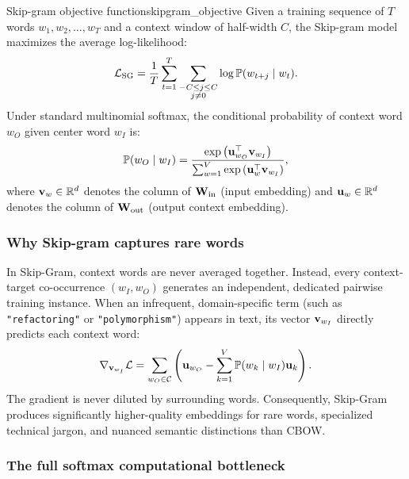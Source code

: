 \documentclass[../../../main.tex]{subfiles}
\begin{document}
\begin{definition}{Skip-gram objective function}{skipgram_objective}
Given a training sequence of $T$ words $w_1, w_2, \dots, w_T$ and a context window of half-width $C$, the Skip-gram model maximizes the average log-likelihood:
\begin{equation}
\label{eq:skipgram_loglik}
\mathcal{L}_{\text{SG}} = \frac{1}{T} \sum_{t=1}^T \sum_{\substack{-C \le j \le C \\ j \neq 0}} \log \mathbb{P}(w_{t+j} \mid w_t).
\end{equation}
Under standard multinomial softmax, the conditional probability of context word $w_O$ given center word $w_I$ is:
\begin{equation}
\label{eq:skipgram_softmax}
\mathbb{P}(w_O \mid w_I) = \frac{\exp\left( \mathbf{u}_{w_O}^\top \mathbf{v}_{w_I} \right)}{\sum_{w=1}^V \exp\left( \mathbf{u}_w^\top \mathbf{v}_{w_I} \right)},
\end{equation}
where $\mathbf{v}_w \in \mathbb{R}^d$ denotes the column of $\mathbf{W}_{\text{in}}$ (input embedding) and $\mathbf{u}_w \in \mathbb{R}^d$ denotes the column of $\mathbf{W}_{\text{out}}$ (output context embedding).
\end{definition}

\subsubsection{Why Skip-gram captures rare words}
\label{subsec:skipgram_rare_words}

In Skip-Gram, context words are never averaged together. Instead, every context-target co-occurrence $(w_I, w_O)$ generates an independent, dedicated pairwise training instance. When an infrequent, domain-specific term (such as \texttt{"refactoring"} or \texttt{"polymorphism"}) appears in text, its vector $\mathbf{v}_{w_I}$ directly predicts each context word:
\begin{equation}
\label{eq:skipgram_pair_grad}
\nabla_{\mathbf{v}_{w_I}} \mathcal{L} = \sum_{w_O \in \mathcal{C}} \left( \mathbf{u}_{w_O} - \sum_{k=1}^V \mathbb{P}(w_k \mid w_I) \mathbf{u}_k \right).
\end{equation}
The gradient is never diluted by surrounding words. Consequently, Skip-Gram produces significantly higher-quality embeddings for rare words, specialized technical jargon, and nuanced semantic distinctions than CBOW.

\subsubsection{The full softmax computational bottleneck}
\label{subsec:softmax_bottleneck}
\end{document}
